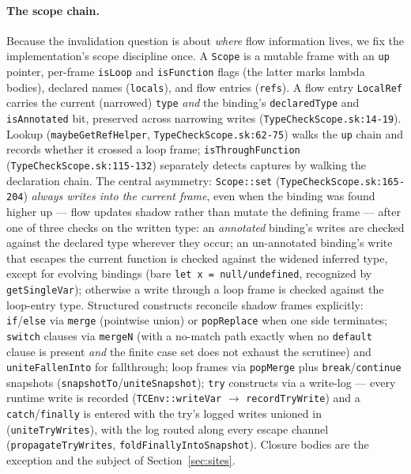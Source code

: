 \documentclass[11pt]{article}
\begin{document}
\paragraph{The scope chain.}
Because the invalidation question is about \emph{where} flow information
lives, we fix the implementation's scope discipline once. A
\texttt{Scope} is a mutable frame with an \texttt{up} pointer, per-frame
\texttt{isLoop} and \texttt{isFunction} flags (the latter marks lambda
bodies), declared names (\texttt{locals}), and flow entries
(\texttt{refs}). A flow entry \texttt{LocalRef} carries the current
(narrowed) \texttt{type} \emph{and} the binding's \texttt{declaredType}
and \texttt{isAnnotated} bit, preserved across narrowing writes
(\texttt{TypeCheckScope.sk:14-19}). Lookup (\texttt{maybeGetRefHelper},
\texttt{TypeCheckScope.sk:62-75}) walks the \texttt{up} chain and records
whether it crossed a loop frame; \texttt{isThroughFunction}
(\texttt{TypeCheckScope.sk:115-132}) separately detects captures by
walking the declaration chain. The central asymmetry: \texttt{Scope::set}
(\texttt{TypeCheckScope.sk:165-204}) \emph{always writes into the current
frame}, even when the binding was found higher up — flow updates shadow
rather than mutate the defining frame — after one of three checks on the
written type: an \emph{annotated} binding's writes are checked against
the declared type wherever they occur; an un-annotated binding's write
that escapes the current function is checked against the widened
inferred type, except for evolving bindings (bare
\texttt{let x = null/undefined}, recognized by
\texttt{getSingleVar}); otherwise a write through a loop frame is
checked against the loop-entry type. Structured constructs reconcile
shadow frames explicitly: \texttt{if}/\texttt{else} via \texttt{merge}
(pointwise union) or \texttt{popReplace} when one side terminates;
\texttt{switch} clauses via \texttt{mergeN} (with a no-match path exactly
when no \texttt{default} clause is present \emph{and} the finite case set
does not exhaust the scrutinee) and
\texttt{uniteFallenInto} for fallthrough; loop frames via
\texttt{popMerge} plus \texttt{break}/\texttt{continue} snapshots
(\texttt{snapshotTo}/\texttt{uniteSnapshot}); \texttt{try} constructs
via a write-log — every runtime write is recorded
(\texttt{TCEnv::writeVar} $\to$ \texttt{recordTryWrite}) and a
\texttt{catch}/\texttt{finally} is entered with the try's logged writes
unioned in (\texttt{uniteTryWrites}), with the log routed along every
escape channel (\texttt{propagateTryWrites},
\texttt{foldFinallyIntoSnapshot}). Closure bodies are the exception and
the subject of Section~\ref{sec:sites}.
\end{document}

